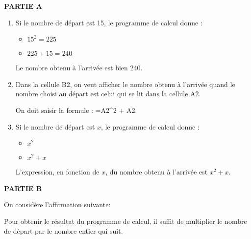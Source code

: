 
\medskip

\begin{center}
\textbf{PARTIE A}
\end{center}

\begin{enumerate}
\item Si le nombre de départ est 15, le programme de calcul donne :
\begin{itemize}[label=$\bullet$~]
	\item $15^2 = 225$
	\item $225 + 15 = 240$
\end{itemize}
Le nombre obtenu à l'arrivée est bien 240.

\item Dans la cellule B2, on veut afficher le nombre obtenu à l'arrivée quand le nombre choisi au départ est celui qui se lit dans la cellule A2.

On doit saisir la formule : \og =A2\^{}2 + A2\fg{}.

\item Si le nombre de départ est $x$, le programme de calcul donne :
\begin{itemize}[label=$\bullet$~]
	\item $x^2$
	\item $x^2 + x$
\end{itemize}
L'expression, en fonction de $x$, du nombre obtenu à l'arrivée est $x^2 + x$.

\end{enumerate}

\begin{center}
\textbf{PARTIE B}
\end{center}

On considère l'affirmation suivante:

\og Pour obtenir le résultat du programme de calcul, il suffit de multiplier le nombre de départ par le nombre entier qui suit. \fg


